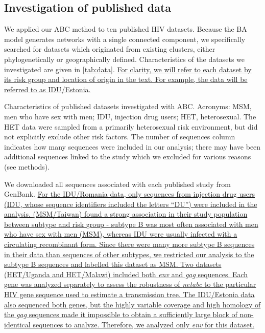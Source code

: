 \documentclass[12pt]{article}\usepackage[]{graphicx}\usepackage[]{color}
\let\mref\cref
\renewcommand{\cref}[1]{\mbox{\mref{#1}}}
\newcommand{\add}[1]{\color{blue} \uline{#1} \color{black}}
\newcommand{\tablepath}{../tables}
\begin{document}
\subsection*{Investigation of published data}
  
We applied our ABC method to ten published HIV datasets. Because the BA model
generates networks with a single connected component, we specifically searched
for datasets which originated from existing clusters, either phylogenetically
or geographically defined. Characteristics of the datasets we investigated are
given in \cref{tab:data}. \add{For clarity, we will refer to each dataset by
its risk group and location of origin in the text. For example, the
\textcite{zetterberg2004two} data will be referred to as IDU/Estonia.}

\begin{table*}[!t]
  \centering
  
  \caption{
    Characteristics of published datasets investigated with ABC.
    Acronyms: MSM, men who have sex with men; IDU, injection drug users; HET,
    heterosexual. The HET data were sampled from a primarily heterosexual risk
    environment, but did not explicitly exclude other risk factors. The number
    of sequences column indicates how many sequences were included in our
    analysis; there may have been additional sequences linked to the study
    which we excluded for various reasons (see methods).
  }
  \label{tab:data}
\end{table*}

We downloaded all sequences associated with each published study from GenBank.
\add{For the IDU/Romania data, only sequences from injection drug users (IDU,
whose sequence identifiers included the letters ``DU'') were included in the
analysis. \textcite{kao2011surveillance} (MSM/Taiwan) found a strong
association in their study population between subtype and risk group - subtype
B was most often associated with men who have sex with men (MSM), whereas IDU
were usually infected with a circulating recombinant form. Since there were
many more subtype B sequences in their data than sequences of other subtypes,
we restricted our analysis to the subtype B sequences and labelled this dataset
as MSM. Two datasets (HET/Uganda and HET/Malawi) included both \textit{env}
and \textit{gag} sequences. Each gene was analyzed separately to assess the
robustness of \textit{netabc} to the particular HIV gene sequence used to
estimate a transmission tree. The IDU/Estonia data also sequenced both genes, 
but the highly variable coverage and high homology of the \textit{gag}
sequences made it impossible to obtain a sufficiently large block of
non-identical sequences to analyze. Therefore, we analyzed only \textit{env}
for this dataset.}
\end{document}
